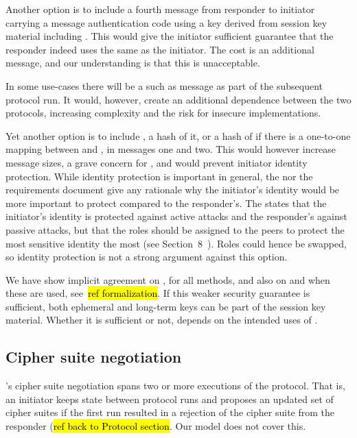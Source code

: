 \documentclass[runningheads,draft]{llncs}
\begin{document}
Another option is to include a fourth message from responder to initiator
carrying a message authentication code using a key derived from session key
material including \mGiy{}.
%
This would give the initiator sufficient guarantee that the responder indeed
uses the same \mGiy{} as the initiator.
%
The cost is an additional message, and our understanding is that this is
unacceptable.
%

In some use-cases there will be a such as message as part of
the subsequent \mOscore{} protocol run.
%
It would, however, create an additional dependence between the two protocols,
increasing complexity and the risk for insecure implementations.
%

Yet another option is to include \mGi{}, a hash of it, or a hash of \mIdcredi{}
if there is a one-to-one mapping between \mIdcredi{} and \mGi{}, in messages one
and two.
%
This would however increase message sizes, a grave concern for \mEdhoc{}, and
would prevent initiator identity protection.
%
While identity protection is important in general, the \mSpec{} nor the
requirements document give any rationale why the initiator's identity would be
more important to protect compared to the responder's.
%
The \mSpec{} states that the
initiator's identity is protected against active attacks and the responder's
against passive attacks, but that the roles should be assigned to the \mCoap{}
peers to protect the most sensitive identity the most (see
Section~8~\cite{selander-lake-edhoc-01}).
%
Roles could hence be swapped, so identity protection is not a strong argument
against this option.
%

We have show implicit agreement on \mGx{}, \mGy{} for all methods, and also on
\mGiy{} and \mGrx{} when these are used, see~\hl{ref formalization}.
%
If this weaker security guarantee is sufficient, both ephemeral and long-term
keys can be part of the session key material.
%
Whether it is sufficient or not, depends on the intended uses of \mEdhoc{}.
%

\subsection{Cipher suite negotiation}
\label{sec:ciphersuiteNegotiation}
%
\mEdhoc{}'s cipher suite negotiation spans two or more executions of the protocol.
%
That is, an initiator keeps state between protocol runs and proposes an updated
set of cipher suites if the first run resulted in a rejection of the
cipher suite from the responder (\hl{ref back to Protocol section}.
%
Our model does not cover this.
%
\end{document}
